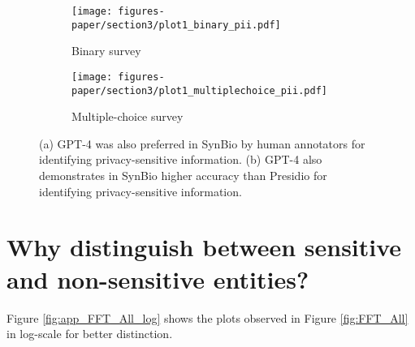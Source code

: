 \begin{figure}[!h]
    \centering
    \begin{subfigure}{.49\linewidth}
        \texttt{[image: figures-paper/section3/plot1\_binary\_pii.pdf]}
        \caption{Binary survey}
        \label{fig:binary-pii}
    \end{subfigure}
    \begin{subfigure}{.49\linewidth}
        \texttt{[image: figures-paper/section3/plot1\_multiplechoice\_pii.pdf]}
        \caption{Multiple-choice survey}
        \label{fig:mult-pii}
    \end{subfigure}
    \caption{
    (a) GPT-4 was also preferred in SynBio by human annotators for identifying privacy-sensitive information.
    (b) GPT-4 also demonstrates in SynBio higher accuracy than Presidio for identifying privacy-sensitive information.
    }
    \label{fig:human-survey-quest-tools}
\end{figure}


\section{Why distinguish between sensitive and non-sensitive entities?}
\label{appendix:sens_non_sens_distinction}

Figure \ref{fig:app_FFT_All_log} shows the plots observed in Figure \ref{fig:FFT_All} in log-scale for better distinction.

